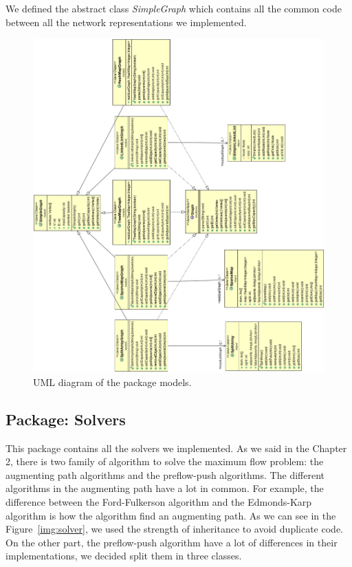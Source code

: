 We defined the abstract class \textit{SimpleGraph} which contains all the common code between all the network representations we implemented. 

\begin{figure}
\centering
\includegraphics[scale=0.45]{images/models_diagram.png}
\caption{UML diagram of the package models.}
\label{img:models}
\end{figure}

\subsection{Package: Solvers}
 This package contains all the solvers we implemented. As we said in the Chapter 2, there is two family of algorithm to solve the maximum flow problem: the augmenting path algorithms and the preflow-push algorithms. The different algorithms in the augmenting path have a lot in common. For example, the difference between the Ford-Fulkerson algorithm and the Edmonds-Karp algorithm is how the algorithm find an augmenting path.  As we can see in the Figure~\ref{img:solver}, we used the strength of inheritance to avoid duplicate code. On the other part, the preflow-push algorithm have a lot of differences in their implementations, we decided split them in three classes.


